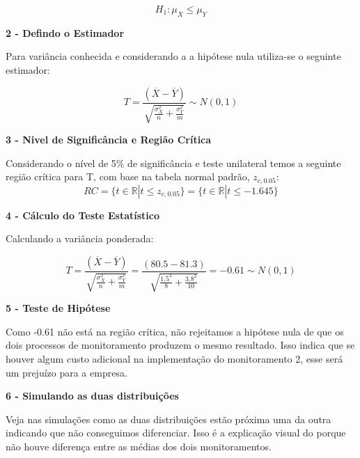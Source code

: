 \documentclass[
  letterpaper,
  DIV=11,
  numbers=noendperiod]{scrartcl}
\begin{document}
\[H_1: \mu_X\leq\mu_Y\]

\vspace{0.5cm}

\textbf{2 - Defindo o Estimador}

Para variância conhecida e considerando a a hipótese nula utiliza-se o
seguinte estimador:

\[T=\frac{(\overline{X}-\overline{Y})}{\sqrt{\frac{\sigma^2_X}{n}+\frac{\sigma^2_Y}{m}}}\sim N(0,1)\]

\vspace{0.5cm}

\textbf{3 - Nivel de Significância e Região Crítica}

Considerando o nível de 5\% de significância e teste unilateral temos a
seguinte região crítica para T, com base na tabela normal padrão,
\(z_{c,0.05}\):\\

\[RC=\{t \in \mathbb{R} |t\leq z_{c,0.05} \} = \{t \in \mathbb{R} |t\leq -1.645 \}\]
\vspace{0.5cm}

\textbf{4 - Cálculo do Teste Estatístico}

Calculando a variância ponderada:

\[T=\frac{(\overline{X}-\overline{Y})}{\sqrt{\frac{\sigma^2_X}{n}+\frac{\sigma^2_Y}{m}}}= \frac{(80.5-81.3)}{\sqrt{\frac{1.5^2}{8}+\frac{3.8^2}{10}}}= -0.61\sim N(0,1)\]

\vspace{0.5cm}

\textbf{5 - Teste de Hipótese}

\vspace{0.5cm}

Como -0.61 não está na região crítica, não rejeitamos a hipótese nula de
que os dois processos de monitoramento produzem o mesmo resultado. Isso
indica que se houver algum custo adicional na implementação do
monitoramento 2, esse será um prejuízo para a empresa.

\vspace{0.5cm}

\textbf{6 - Simulando as duas distribuições}

\vspace{0.5cm}

Veja nas simulações como as duas distribuições estão próxima uma da
outra indicando que não conseguimos diferenciar. Isso é a explicação
visual do porque não houve diferença entre as médias dos dois
monitoramentos.

\vspace{0.5cm}
\end{document}

